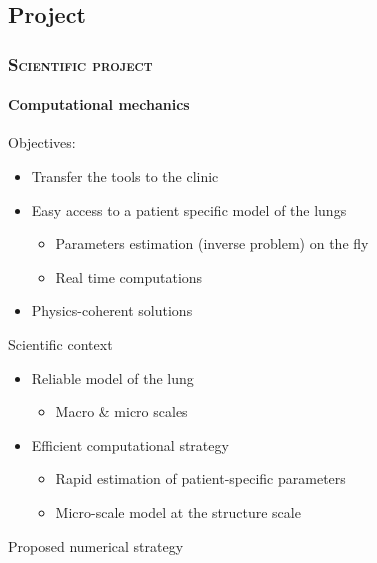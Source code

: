 \documentclass[aspectratio=1610, 10pt]{beamer}
\begin{document}
        \subsection{Project}
	\begin{frame}
		\frametitle{\textsc{Scientific project}}
		\framesubtitle{Computational mechanics} 
		\begin{blueblockshadow}{Objectives:}
				\begin{itemize}
					\item Transfer the tools to the clinic
					\item Easy access to a patient specific model of the lungs
					\begin{itemize}
						\item Parameters estimation (inverse problem) on the fly 
						\item Real time computations
					\end{itemize}
					\item Physics-coherent solutions
				\end{itemize}
		\end{blueblockshadow}
		\vfill
		\begin{minipage}[t]{0.5\linewidth}
			\begin{greenblockshadow}{Scientific context}
				\begin{itemize}
					\item[\textcolor{LGreenLMS}{\faLockOpen}] Reliable model of the lung
					\begin{itemize}
						\item Macro \& micro scales
					\end{itemize}
					\item[{\textcolor{RougeLMS}\faLock}] Efficient computational strategy 
					\begin{itemize}
						\item Rapid estimation of patient-specific parameters 
						\item Micro-scale model at the structure scale 
					\end{itemize}
				\end{itemize}
			\end{greenblockshadow}
		\end{minipage}
		\hfill
		\begin{minipage}[t]{0.48\linewidth}
			\begin{greenblockshadow}{Proposed numerical strategy}

\end{greenblockshadow}
\end{minipage}
\end{frame}
\end{document}
